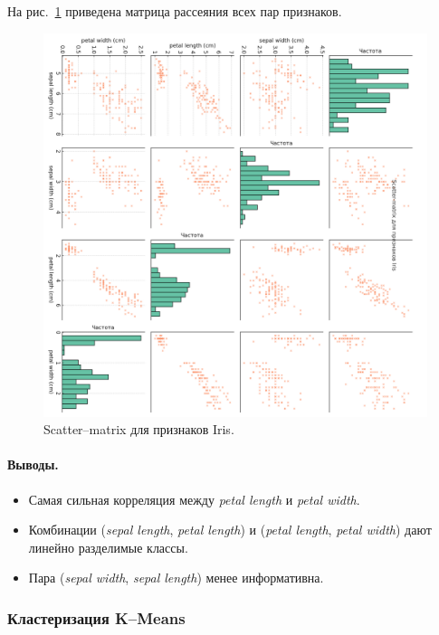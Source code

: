 На рис.~\ref{fig:scatter_matrix} приведена матрица рассеяния всех пар признаков.

\begin{figure}[ht]
  \centering
  \includegraphics[width=\textwidth]{images/scatter_matrix_cb2.png}
  \caption{Scatter–matrix для признаков Iris.}
  \label{fig:scatter_matrix}
\end{figure}

\paragraph{Выводы.}
\begin{itemize}
  \item Самая сильная корреляция между \emph{petal length} и \emph{petal width}.
  \item Комбинации (\emph{sepal length}, \emph{petal length}) и (\emph{petal length}, \emph{petal width}) дают линейно разделимые классы.
  \item Пара (\emph{sepal width}, \emph{sepal length}) менее информативна.
\end{itemize}

\subsubsection{Кластеризация K–Means}

